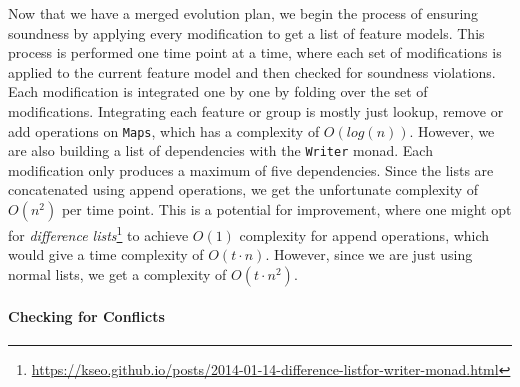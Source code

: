 \documentclass[a4paper,english]{ifimaster}
\begin{document}
Now that we have a merged evolution plan, we begin the process of ensuring soundness by applying every modification to get a list of feature models. This process is performed one time point at a time, where each set of modifications is applied to the current feature model and then checked for soundness violations. Each modification is integrated one by one by folding over the set of modifications. Integrating each feature or group is mostly just lookup, remove or add operations on \texttt{Maps}, which has a complexity of $O(log(n))$. However, we are also building a list of dependencies with the \texttt{Writer} monad. Each modification only produces a maximum of five dependencies. Since the lists are concatenated using append operations, we get the unfortunate complexity of $O(n^2)$ per time point. This is a potential for improvement, where one might opt for \textit{difference lists}\footnote{\url{https://kseo.github.io/posts/2014-01-14-difference-listfor-writer-monad.html}} to achieve $O(1)$ complexity for append operations, which would give a time complexity of $O(t \cdot n)$. However, since we are just using normal lists, we get a complexity of $O(t \cdot n^2)$.

\paragraph{Checking for Conflicts}
\end{document}

